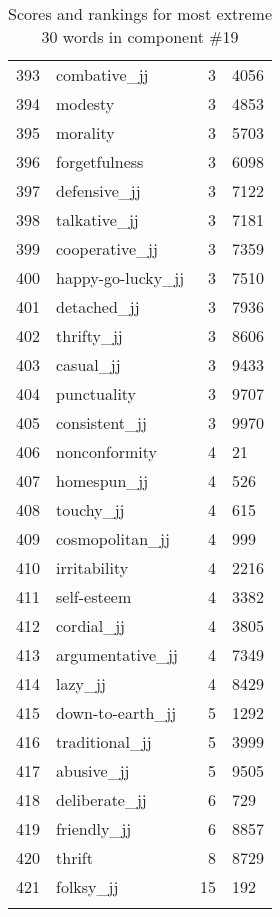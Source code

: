 \begin{longtable}[!htbp]{| rlr@{.}l |}
    393 & combative\_jj & 3 & 4056 \\
    394 & modesty & 3 & 4853 \\
    395 & morality & 3 & 5703 \\
    396 & forgetfulness & 3 & 6098 \\
    397 & defensive\_jj & 3 & 7122 \\
    398 & talkative\_jj & 3 & 7181 \\
    399 & cooperative\_jj & 3 & 7359 \\
    400 & happy-go-lucky\_jj & 3 & 7510 \\
    401 & detached\_jj & 3 & 7936 \\
    402 & thrifty\_jj & 3 & 8606 \\
    403 & casual\_jj & 3 & 9433 \\
    404 & punctuality & 3 & 9707 \\
    405 & consistent\_jj & 3 & 9970 \\
    406 & nonconformity & 4 & 21 \\
    407 & homespun\_jj & 4 & 526 \\
    408 & touchy\_jj & 4 & 615 \\
    409 & cosmopolitan\_jj & 4 & 999 \\
    410 & irritability & 4 & 2216 \\
    411 & self-esteem & 4 & 3382 \\
    412 & cordial\_jj & 4 & 3805 \\
    413 & argumentative\_jj & 4 & 7349 \\
    414 & lazy\_jj & 4 & 8429 \\
    415 & down-to-earth\_jj & 5 & 1292 \\
    416 & traditional\_jj & 5 & 3999 \\
    417 & abusive\_jj & 5 & 9505 \\
    418 & deliberate\_jj & 6 & 729 \\
    419 & friendly\_jj & 6 & 8857 \\
    420 & thrift & 8 & 8729 \\
    421 & folksy\_jj & 15 & 192 \\
    \hline
    \caption{Scores and rankings for most extreme 30 words in component \#19} \\
\end{longtable}
